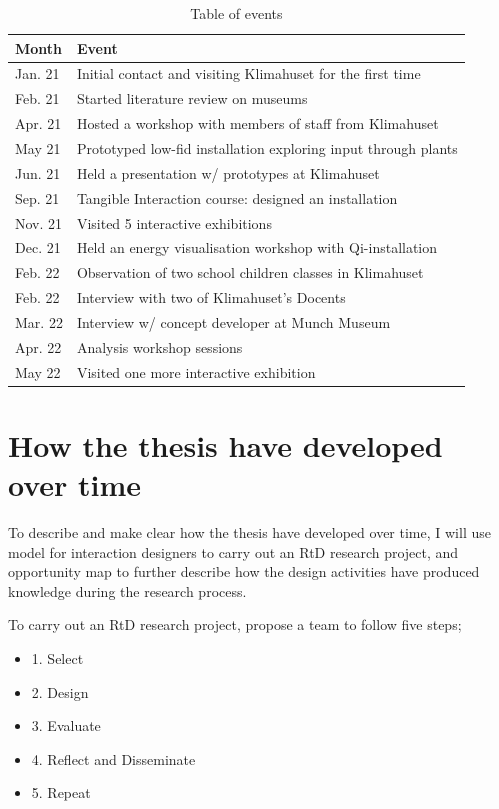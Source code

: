 \begin{table}[h]
\centering
\begin{tabular}{| l | l|}
\hline
\textbf{Month} & \textbf{Event}\\
\hline
Jan. 21 & Initial contact and visiting Klimahuset for the first time \\
Feb. 21 & Started literature review on museums \\
Apr. 21 & Hosted a workshop with members of staff from Klimahuset \\
May 21 & Prototyped low-fid installation exploring input through plants \\
Jun. 21 & Held a presentation w/ prototypes at Klimahuset \\
Sep. 21 & Tangible Interaction course: designed an installation \\
Nov. 21 & Visited 5 interactive exhibitions \\
Dec. 21 & Held an energy visualisation workshop with Qi-installation \\
Feb. 22 & Observation of two school children classes in Klimahuset \\
Feb. 22 & Interview with two of Klimahuset's Docents \\
Mar. 22 & Interview w/ concept developer at Munch Museum \\
Apr. 22 & Analysis workshop sessions \\
May 22 & Visited one more interactive exhibition \\
\hline
\end{tabular}
\caption{Table of events}
\label{tab:abc}
\end{table}






\section{How the thesis have developed over time}
To describe and make clear how the thesis have developed over time, I will use \autocite{zimmerman_research_2014} model for interaction designers to carry out an RtD research project, and \autocite[]{zimmerman_discovering_2004} opportunity map to further describe how the design activities have produced knowledge during the research process.

To carry out an RtD research project, \autocite[]{zimmerman_research_2014} propose a team to follow five steps;
\begin{itemize}
    \item 1. Select
    \item 2. Design
    \item 3. Evaluate
    \item 4. Reflect and Disseminate
    \item 5. Repeat
\end{itemize}


